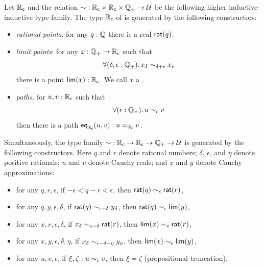 \begin{defn}\label{defn:cauchy-reals}
  Let $\RC$ and the relation $\closesym:\RC \times \RC \times \Qp \to \type$ be the following higher inductive-inductive type family.
  The type $\RC$ of 
  is generated by the following constructors:
  \begin{itemize}
  \item \emph{rational points:}
    for any $q : \Q$ there is a real $\rcrat(q)$.
  \item \emph{limit points}:
    for any $x : \Qp \to \RC$ such that
    \begin{equation}
      \label{eq:RC-cauchy}
      \fall{\delta, \epsilon : \Qp} x_\delta \close{\delta + \epsilon} x_\epsilon
    \end{equation}
    there is a point $\rclim(x) : \RC$. We call $x$ a .
  \item \emph{paths:}
    for $u, v : \RC$ such that
    \begin{equation}
      \label{eq:RC-path}
      \fall{\epsilon : \Qp} u \close\epsilon v
    \end{equation}
    then there is a path $\rceq(u, v) : \id[\RC]{u}{v}$.
  \end{itemize}
  Simultaneously, the type family $\closesym:\RC\to\RC\to\Qp \to\type$ is generated by the following constructors.
  Here $q$ and $r$ denote rational numbers; $\delta$, $\epsilon$, and $\eta$ denote positive rationals; $u$ and $v$ denote Cauchy reals; and $x$ and $y$ denote Cauchy approximations:
  \begin{itemize}
  \item for any $q,r,\epsilon$, if $-\epsilon < q - r < \epsilon$, then $\rcrat(q) \close\epsilon \rcrat(r)$,
  \item for any $q,y,\epsilon,\delta$, if $\rcrat(q) \close{\epsilon - \delta} y_\delta$, then $\rcrat(q) \close{\epsilon} \rclim(y)$,
  \item for any $x,r,\epsilon,\delta$, if $x_\delta \close{\epsilon - \delta} \rcrat(r)$, then $\rclim(x) \close\epsilon \rcrat(r)$,
  \item for any $x,y,\epsilon,\delta,\eta$, if $x_\delta \close{\epsilon - \delta - \eta} y_\eta$, then $\rclim(x) \close\epsilon \rclim(y)$,
  \item for any $u,v,\epsilon$, if $\xi,\zeta : u \close{\epsilon} v$, then $\xi=\zeta$ (propositional truncation).
  \end{itemize}
\end{defn}

